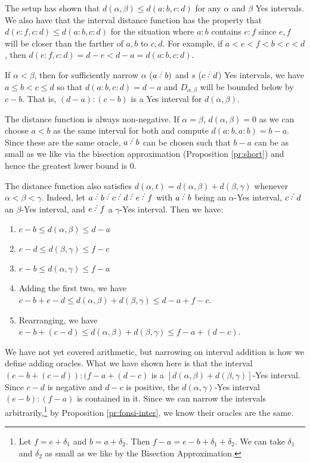 \documentclass[12pt]{article}
\begin{document}
The setup has shown that $d(\alpha,\beta) \leq d(a:b, c:d)$ for any $\alpha$ and $\beta$ Yes intervals. We also have that the interval distance function has the property that $d(e:f, c:d) \leq d(a:b, c:d)$ for the situation where $a:b$ contains $e:f$ since $e, f$ will be closer than the farther of $a,b$ to $c,d$. For example, if $a < e < f < b < c< d$, then $d(e:f, c:d) = d-e < d-a = d(a:b, c:d)$. 

If $\alpha<\beta$, then for sufficiently narrow $\alpha$ ($a\lte b)$ and $s$ ($c\lte d$) Yes intervals, we have $a\leq b<c \leq d$ so that $d(a:b,c:d) = d-a$ and $D_{\alpha,\beta}$ will be bounded below by $c-b$. That is, $(d-a):(c-b)$ is a Yes interval for $d(\alpha,\beta)$.

The distance function is always non-negative. If $\alpha=\beta$, $d(\alpha,\beta)=0$ as we can choose $a<b$ as the same interval for both and compute $d(a:b,a:b)= b-a$. Since these are the same oracle, $a\lte b$ can be chosen such that $b-a$ can be as small as we like via the bisection approximation (Proposition \ref{pr:short}) and hence the greatest lower bound is 0. 

The distance function also satisfies $d(\alpha,t) = d(\alpha,\beta) + d(\beta, \gamma)$ whenever $\alpha < \beta < \gamma$. Indeed, let $a\lte b\lte c\lte d\lte e\lte f$ with $a\lte b$ being an $\alpha$-Yes interval, $c\lte d$ an $\beta$-Yes interval, and $e\lte f$ a $\gamma$-Yes interval. Then we have: 
\begin{enumerate}
\item $c-b \leq d(\alpha,\beta) \leq d-a$
\item $e-d \leq d(\beta, \gamma) \leq f-c$
\item $e-b \leq d(\alpha,\gamma) \leq f-a$
\item Adding the first two, we have $c-b + e-d \leq d(\alpha,\beta) + d(\beta, \gamma) \leq d-a + f-c$.
\item Rearranging, we have $e-b + (c-d) \leq d(\alpha,\beta) + d(\beta, \gamma) \leq f-a + (d-c)$.
\end{enumerate}
We have not yet covered arithmetic, but narrowing on interval addition is how we define adding oracles. What we have shown here is that the interval $(e-b + (c-d)): (f-a + (d-c)$ is a $[d(\alpha,\beta) + d(\beta, \gamma)]$-Yes interval. Since $c-d$ is negative and $d-c$ is positive, the $d(\alpha,\gamma)$-Yes interval $(e-b):(f-a)$ is contained in it. Since we can narrow the intervals arbitrarily,\footnote{Let $f = e + \delta_1$ and $b = a + \delta_2$. Then $f-a = e-b + \delta_1 + \delta_2$. We can take $\delta_1$ and $\delta_2$ as small as we like by the Bisection Approximation.} by Proposition \ref{pr:fonsi-inter}, we know their oracles are the same. 
\end{document}

